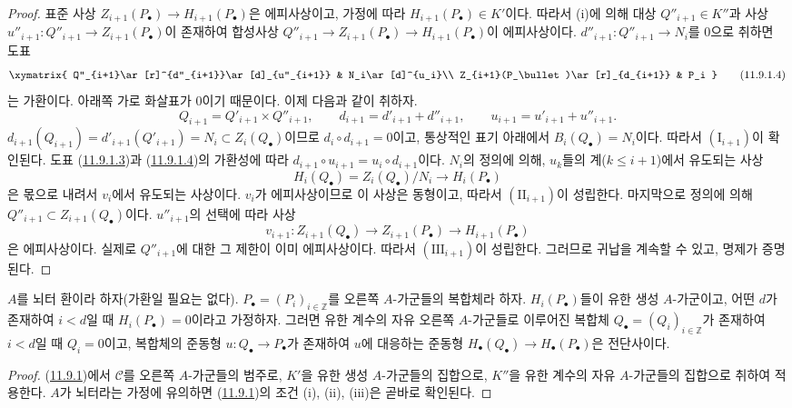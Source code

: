 \begin{proof}
표준 사상 $Z_{i+1}(P_\bullet)\to H_{i+1}(P_\bullet)$은 에피사상이고,
가정에 따라 $H_{i+1}(P_\bullet)\in K'$이다. 따라서 (i)에 의해 대상
$Q''_{i+1}\in K''$과 사상
$u''_{i+1}:Q''_{i+1}\to Z_{i+1}(P_\bullet)$이 존재하여 합성사상
$Q''_{i+1}\to Z_{i+1}(P_\bullet)\to H_{i+1}(P_\bullet)$이
에피사상이다. $d''_{i+1}:Q''_{i+1}\to N_i$를 $0$으로 취하면 도표
\[
\xymatrix{
Q''_{i+1}\ar[r]^{d''_{i+1}}\ar[d]_{u''_{i+1}} &
N_i\ar[d]^{u_i}\\
Z_{i+1}(P_\bullet)\ar[r]_{d_{i+1}} & P_i
}
\tag{11.9.1.4}\label{0.11.9.1.4-fr}
\]
는 가환이다. 아래쪽 가로 화살표가 $0$이기 때문이다.
이제 다음과 같이 취하자.
\[
Q_{i+1}=Q'_{i+1}\times Q''_{i+1},\qquad
d_{i+1}=d'_{i+1}+d''_{i+1},\qquad
u_{i+1}=u'_{i+1}+u''_{i+1}.
\]
$d_{i+1}(Q_{i+1})=d'_{i+1}(Q'_{i+1})=N_i\subset Z_i(Q_\bullet)$이므로
$d_i\circ d_{i+1}=0$이고, 통상적인 표기 아래에서
$B_i(Q_\bullet)=N_i$이다. 따라서 $(\mathrm I_{i+1})$이 확인된다. 도표
(\hyperref[0.11.9.1.3-fr]{11.9.1.3})과
(\hyperref[0.11.9.1.4-fr]{11.9.1.4})의 가환성에 따라
$d_{i+1}\circ u_{i+1}=u_i\circ d_{i+1}$이다. $N_i$의 정의에 의해,
$u_k$들의 계($k\leq i+1$)에서 유도되는 사상
\[
H_i(Q_\bullet)=Z_i(Q_\bullet)/N_i\longrightarrow H_i(P_\bullet)
\]
은 몫으로 내려서 $v_i$에서 유도되는 사상이다. $v_i$가 에피사상이므로
이 사상은 동형이고, 따라서 $(\mathrm{II}_{i+1})$이 성립한다. 마지막으로
정의에 의해 $Q''_{i+1}\subset Z_{i+1}(Q_\bullet)$이다.
$u''_{i+1}$의 선택에 따라 사상
\[
v_{i+1}:Z_{i+1}(Q_\bullet)\longrightarrow Z_{i+1}(P_\bullet)
\longrightarrow H_{i+1}(P_\bullet)
\]
은 에피사상이다. 실제로 $Q''_{i+1}$에 대한 그 제한이 이미
에피사상이다. 따라서 $(\mathrm{III}_{i+1})$이 성립한다. 그러므로 귀납을
계속할 수 있고, 명제가 증명된다.
\end{proof}

\begin{corollary}[11.9.2]
\label{0.11.9.2-fr}
$A$를 뇌터 환이라 하자(가환일 필요는 없다). $P_\bullet=(P_i)_{i\in\mathbb Z}$를
오른쪽 $A$-가군들의 복합체라 하자. $H_i(P_\bullet)$들이 유한 생성
$A$-가군이고, 어떤 $d$가 존재하여 $i<d$일 때 $H_i(P_\bullet)=0$이라고
가정하자. 그러면 유한 계수의 자유 오른쪽 $A$-가군들로 이루어진 복합체
$Q_\bullet=(Q_i)_{i\in\mathbb Z}$가 존재하여 $i<d$일 때 $Q_i=0$이고,
복합체의 준동형 $u:Q_\bullet\to P_\bullet$가 존재하여 $u$에 대응하는
준동형 $H_\bullet(Q_\bullet)\to H_\bullet(P_\bullet)$은 전단사이다.
\end{corollary}

\begin{proof}
(\hyperref[0.11.9.1-fr]{11.9.1})에서 $\mathcal C$를 오른쪽
$A$-가군들의 범주로, $K'$을 유한 생성 $A$-가군들의 집합으로, $K''$을
유한 계수의 자유 $A$-가군들의 집합으로 취하여 적용한다.
$A$가 뇌터라는 가정에 유의하면
(\hyperref[0.11.9.1-fr]{11.9.1})의 조건 (i), (ii), (iii)은 곧바로
확인된다.
\end{proof}

